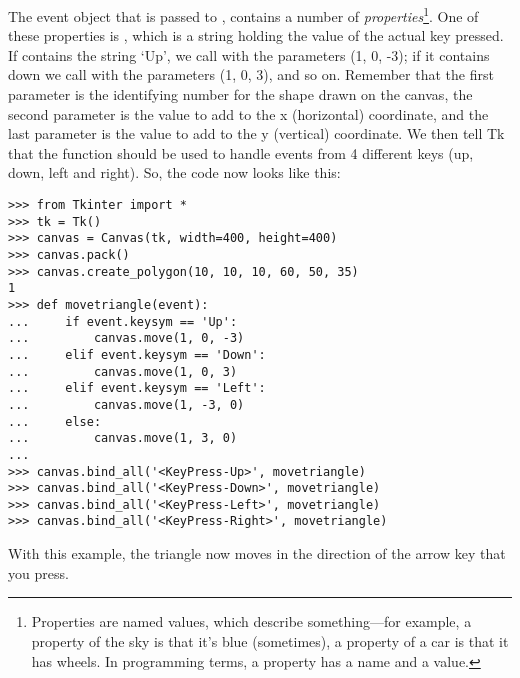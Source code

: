 The event object that is passed to , contains a number of \emph{properties}\footnote{Properties are named values, which describe something---for example, a property of the sky is that it's blue (sometimes), a property of a car is that it has wheels. In programming terms, a property has a name and a value.}.  One of these properties is , which is a string holding the value of the actual key pressed.  If  contains the string `Up', we call  with the parameters (1, 0, -3); if it contains down we call with the parameters (1, 0, 3), and so on.  Remember that the first parameter is the identifying number for the shape drawn on the canvas, the second parameter is the value to add to the x (horizontal) coordinate, and the last parameter is the value to add to the y (vertical) coordinate. We then tell Tk that the  function should be used to handle events from 4 different keys (up, down, left and right).  So, the code now looks like this:

\begin{listingignore}
\begin{verbatim}
>>> from Tkinter import *
>>> tk = Tk()
>>> canvas = Canvas(tk, width=400, height=400)
>>> canvas.pack()
>>> canvas.create_polygon(10, 10, 10, 60, 50, 35)
1 
>>> def movetriangle(event):
...     if event.keysym == 'Up':
...         canvas.move(1, 0, -3)
...     elif event.keysym == 'Down':
...         canvas.move(1, 0, 3)
...     elif event.keysym == 'Left':
...         canvas.move(1, -3, 0)
...     else:
...         canvas.move(1, 3, 0)
... 
>>> canvas.bind_all('<KeyPress-Up>', movetriangle)
>>> canvas.bind_all('<KeyPress-Down>', movetriangle)
>>> canvas.bind_all('<KeyPress-Left>', movetriangle)
>>> canvas.bind_all('<KeyPress-Right>', movetriangle)
\end{verbatim}
\end{listingignore}

\noindent
With this example, the triangle now moves in the direction of the arrow key that you press.

\newpage